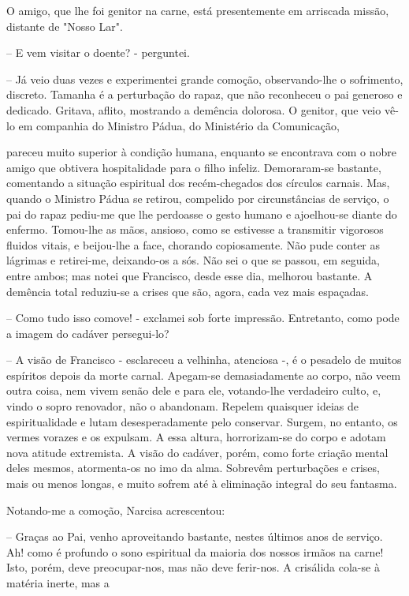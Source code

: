 \documentclass[portuguese,12pt,a4paper]{scrbook}
\begin{document}
	O amigo, que lhe foi genitor na carne, está presentemente em arriscada missão, distante de "Nosso Lar".
	
	– E vem visitar o doente? - perguntei.
	
	– Já veio duas vezes e experimentei grande comoção, observando-lhe o sofrimento, discreto. Tamanha é a perturbação do rapaz, que não reconheceu o pai generoso e dedicado. Gritava, aflito, mostrando a demência dolorosa. O genitor, que veio vê-lo em companhia do Ministro Pádua, do Ministério da Comunicação,
	
	
	pareceu muito superior à condição humana, enquanto se encontrava com o nobre amigo que obtivera hospitalidade para o filho infeliz. Demoraram-se bastante, comentando a situação espiritual dos recém-chegados dos círculos carnais. Mas, quando o Ministro Pádua se retirou, compelido por circunstâncias de serviço, o pai do rapaz pediu-me que lhe perdoasse o gesto humano e ajoelhou-se diante do enfermo. Tomou-lhe as mãos, ansioso, como se estivesse a transmitir vigorosos fluidos vitais, e beijou-lhe a face, chorando copiosamente. Não pude conter as lágrimas e retirei-me, deixando-os a sós. Não sei o que se passou, em seguida, entre ambos; mas notei que Francisco, desde esse dia, melhorou bastante. A demência total reduziu-se a crises que são, agora, cada vez mais espaçadas.
	
	– Como tudo isso comove! - exclamei sob forte impressão. Entretanto, como pode a imagem do cadáver persegui-lo?
	
	– A visão de Francisco - esclareceu a velhinha, atenciosa -, é o pesadelo de muitos espíritos depois da morte carnal. Apegam-se demasiadamente ao corpo, não veem outra coisa, nem vivem senão dele e para ele, votando-lhe verdadeiro culto, e, vindo o sopro renovador, não o abandonam. Repelem quaisquer ideias de espiritualidade e lutam desesperadamente pelo conservar. Surgem, no entanto, os vermes vorazes e os expulsam. A essa altura, horrorizam-se do corpo e adotam nova atitude extremista. A visão do cadáver, porém, como forte criação mental deles mesmos, atormenta-os no imo da alma. Sobrevêm perturbações e crises, mais ou menos longas, e muito sofrem até à eliminação integral do seu fantasma.
	
	Notando-me a comoção, Narcisa acrescentou:
	
	– Graças ao Pai, venho aproveitando bastante, nestes últimos anos de serviço. Ah! como é profundo o sono espiritual da maioria dos nossos irmãos na carne! Isto, porém, deve preocupar-nos, mas não deve ferir-nos. A crisálida cola-se à matéria inerte, mas a
	
\end{document}
